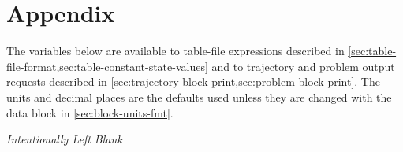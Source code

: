 \chapter*{Appendix}
\label{app:output-variable-reference}

The variables below are available to table-file expressions described in
\cref{sec:table-file-format,sec:table-constant-state-values} and to trajectory
and problem output requests described in
\cref{sec:trajectory-block-print,sec:problem-block-print}. The units and decimal
places are the defaults used unless they are changed with the
 data block in \cref{sec:block-units-fmt}.



\clearpage
\thispagestyle{plain}
\null
\vfill
\begin{center}
  \itshape Intentionally Left Blank
\end{center}
\vfill
\null
